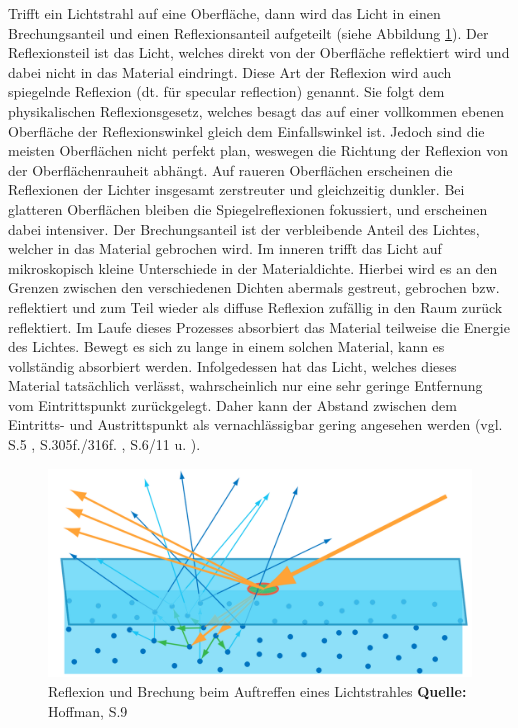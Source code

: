 \documentclass[
  11pt,
  a4paper,
  oneside
  ]{article}
\begin{document}
Trifft ein Lichtstrahl auf eine Oberfläche, dann wird das Licht in einen Brechungsanteil und einen Reflexionsanteil aufgeteilt (siehe Abbildung \ref{fig:img10}). Der Reflexionsteil ist das Licht, welches direkt von der Oberfläche reflektiert wird und dabei nicht in das Material eindringt. Diese Art der Reflexion wird auch spiegelnde Reflexion (dt. für specular reflection) genannt. Sie folgt dem physikalischen Reflexionsgesetz, welches besagt das auf einer vollkommen ebenen Oberfläche der Reflexionswinkel gleich dem Einfallswinkel ist. Jedoch sind die meisten Oberflächen nicht perfekt plan, weswegen die Richtung der Reflexion von der Oberflächenrauheit abhängt. Auf raueren Oberflächen erscheinen die Reflexionen der Lichter insgesamt zerstreuter und gleichzeitig dunkler. Bei glatteren Oberflächen bleiben die Spiegelreflexionen fokussiert, und erscheinen dabei intensiver. Der Brechungsanteil ist der verbleibende Anteil des Lichtes, welcher in das Material gebrochen wird. Im inneren trifft das Licht auf mikroskopisch kleine Unterschiede in der Materialdichte. Hierbei wird es an den Grenzen zwischen den verschiedenen Dichten abermals gestreut, gebrochen bzw. reflektiert und zum Teil wieder als diffuse Reflexion zufällig in den Raum zurück reflektiert. Im Laufe dieses Prozesses absorbiert das Material teilweise die Energie des Lichtes. Bewegt es sich zu lange in einem solchen Material, kann es vollständig absorbiert werden. Infolgedessen hat das Licht, welches dieses Material tatsächlich verlässt, wahrscheinlich nur eine sehr geringe Entfernung vom Eintrittspunkt zurückgelegt. Daher kann der Abstand zwischen dem Eintritts- und Austrittspunkt als vernachlässigbar gering angesehen werden 
(vgl. S.5 \cite{irrlichtOrg}, S.305f./316f. \cite{realTimeRendering4th}, S.6/11 \cite{rtrPaper} u. \cite{learnOpenGL,pbrGuide,googleFilamentPbr}).
\begin{figure}[H]
  \centering
  \includegraphics*[width=0.65 \textwidth]{images/scattering.png}
  \caption{Reflexion und Brechung beim Auftreffen eines Lichtstrahles \footnotesize\textbf{Quelle:} Hoffman, S.9 \cite{rtrPaper}}
  \label{fig:img10}
\end{figure}
\end{document}
